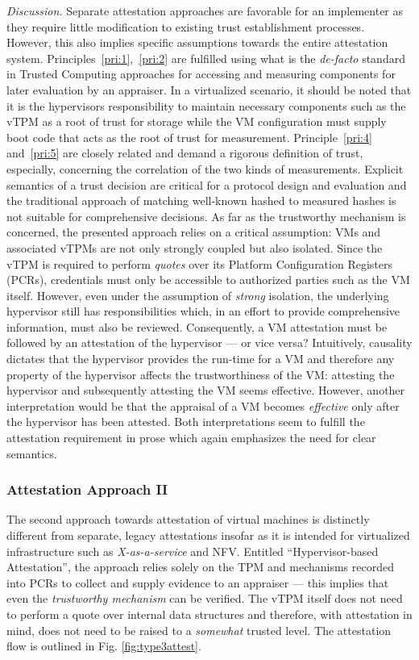 \emph{Discussion.} Separate attestation approaches are favorable for an implementer as they require little modification to existing trust establishment processes. However, this also implies specific assumptions towards the entire attestation system. Principles~\ref{pri:1},~\ref{pri:2} are fulfilled using what is the \emph{de-facto} standard in Trusted Computing approaches for accessing and measuring components for later evaluation by an appraiser. In a virtualized scenario, it should be noted that it is the hypervisors responsibility to maintain necessary components such as the vTPM as a root of trust for storage while the VM configuration must supply boot code that acts as the root of trust for measurement. Principle~\ref{pri:4} and~\ref{pri:5} are closely related and demand a rigorous definition of trust, especially, concerning the correlation of the two kinds of measurements. Explicit semantics of a trust decision are critical for a protocol design and evaluation and the traditional approach of matching well-known hashed to measured hashes is not suitable for comprehensive decisions. As far as the trustworthy mechanism is concerned, the presented approach relies on a critical assumption: VMs and associated vTPMs are not only strongly coupled but also isolated. Since the vTPM is required to perform \emph{quotes} over its Platform Configuration Registers (PCRs), credentials must only be accessible to authorized parties such as the VM itself. However, even under the assumption of \emph{strong} isolation, the underlying hypervisor still has responsibilities which, in an effort to provide comprehensive information, must also be reviewed. Consequently, a VM attestation must be followed by an attestation of the hypervisor --- or vice versa? Intuitively, causality dictates that the hypervisor provides the run-time for a VM and therefore any property of the hypervisor affects the trustworthiness of the VM: attesting the hypervisor and subsequently attesting the VM seems effective. However, another interpretation would be that the appraisal of a VM becomes \emph{effective} only after the hypervisor has been attested. Both interpretations seem to fulfill the attestation requirement in prose which again emphasizes the need for clear semantics.


\subsubsection{Attestation Approach II}

The second approach towards attestation of virtual machines is distinctly different from separate, legacy attestations insofar as it is intended for virtualized infrastructure such as \emph{X-as-a-service} and NFV. Entitled ``Hypervisor-based Attestation'', the approach relies solely on the TPM and mechanisms recorded into PCRs to collect and supply evidence to an appraiser --- this implies that even the \emph{trustworthy mechanism} can be verified. The vTPM itself does not need to perform a quote over internal data structures and therefore, with attestation in mind, does not need to be raised to a \emph{somewhat} trusted level. The attestation flow is outlined in Fig. \ref{fig:type3attest}.

